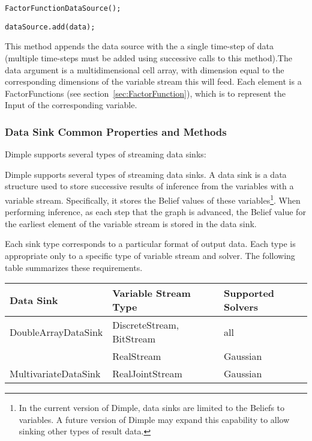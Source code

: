 \ifjava
\begin{lstlisting}
FactorFunctionDataSource();
\end{lstlisting}
\fi




\begin{lstlisting}
dataSource.add(data);
\end{lstlisting}

This method appends the data source with the a single time-step of data (multiple time-steps must be added using successive calls to this method).The data argument is a multidimensional cell array, with dimension equal to the corresponding dimensions of the variable stream this will feed.  Each element is a FactorFunctions (see section~\ref{sec:FactorFunction}), which is to represent the Input of the corresponding variable.


\subsubsection{Data Sink Common Properties and Methods}
\label{sec:DataSink}

Dimple supports several types of streaming data sinks:

Dimple supports several types of streaming data sinks.  A data sink is a data structure used to store successive results of inference from the variables with a variable stream.  Specifically, it stores the Belief values of these variables\footnote{In the current version of Dimple, data sinks are limited to the Beliefs to variables.  A future version of Dimple may expand this capability to allow sinking other types of result data.}.  When performing inference, as each step that the graph is advanced, the Belief value for the earliest element of the variable stream is stored in the data sink.

Each sink type corresponds to a particular format of output data.  Each type is appropriate only to a specific type of variable stream and solver.  The following table summarizes these requirements.

\begin{longtable} {l | l | l}
Data Sink & Variable Stream Type & Supported Solvers \\
\hline
\endhead
DoubleArrayDataSink & DiscreteStream, BitStream & all \\
 & RealStream & Gaussian \\
MultivariateDataSink & RealJointStream & Gaussian \\
\end{longtable} 

